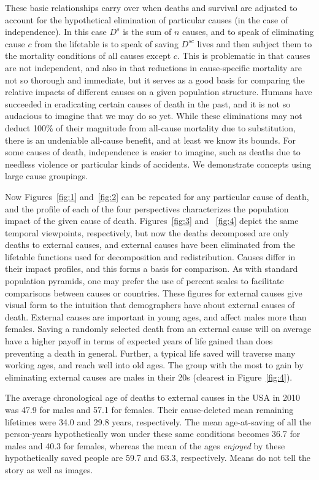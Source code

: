 \documentclass{article}
\begin{document}
These basic relationships carry over when deaths and survival are adjusted to
account for the hypothetical elimination of particular causes (in the case of
independence). In this case $D^s$ is the sum of $n$ causes, and to speak of
eliminating cause $c$ from the lifetable is to speak of saving $D^{sc}$ lives and then
subject them to the mortality conditions of all causes except $c$.
This is problematic in that causes are not independent, and also in that
reductions in cause-specific mortality are not so thorough and immediate, but it
serves as a good basis for comparing the relative impacts of different causes on
a given population structure. Humans have succeeded in eradicating certain
causes of death in the past, and it
is not so audacious to imagine that we may do so yet. While these
eliminations may not deduct 100\% of their magnitude from all-cause mortality
due to substitution, there is an undeniable all-cause benefit, and at least 
we know its bounds. For some causes of death, independence is easier to imagine,
such as deaths due to needless violence or particular kinds of accidents. We
demonstrate concepts using large cause groupings.

Now Figures~\ref{fig:1} and~\ref{fig:2} can be repeated for
any particular cause of death, and the profile of each of the four perspectives
characterizes the population impact of the given cause of death.
Figures~\ref{fig:3} and~ \ref{fig:4} depict the same temporal viewpoints,
respectively, but now the deaths decomposed are only deaths to external
causes, and external causes have been eliminated from the lifetable functions used for decomposition and
 redistribution. Causes differ in their impact profiles, and this forms a
 basis for comparison. As with standard population pyramids, one may prefer the
 use of percent scales to facilitate comparisons between causes or countries. These
 figures for external causes give visual form to the intuition that demographers
 have about external causes of death. External causes are important in
 young ages, and affect males more than females. Saving a randomly selected death from an external
 cause will on average have a higher payoff in terms of expected years of life gained than does preventing a death in general. Further,
 a typical life saved will traverse many working ages, and reach well into old
 ages.
 The group with the most to gain by eliminating external causes are males in
 their 20s (clearest in Figure~\ref{fig:4}).
 
 The average chronological age of deaths to external causes in the USA in 2010
 was 47.9 for males and 57.1 for females. Their cause-deleted mean remaining
 lifetimes were 34.0 and 29.8 years, respectively. The mean age-at-saving of all
 the person-years hypothetically won under these same conditions becomes 36.7
 for males and 40.3 for females, whereas the mean of the ages \textit{enjoyed}
 by these hypothetically saved people are 59.7 and 63.3, respectively. Means do
 not tell the story as well as images. 
\end{document}
